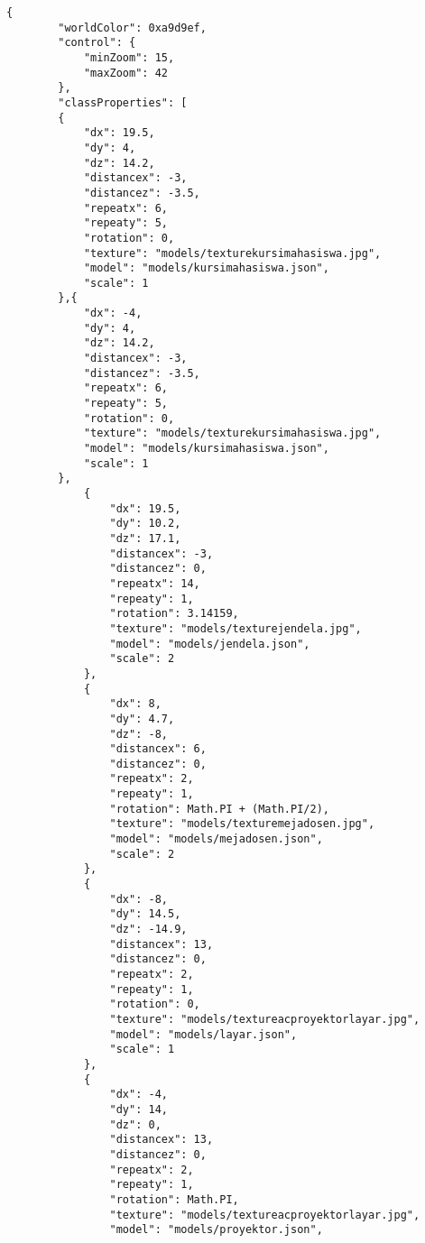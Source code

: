 \begin{lstlisting}[caption={Contoh JSON untuk ruangan kelas pada saat ujian.}, label={lst:json},captionpos=b]
{
        "worldColor": 0xa9d9ef,
        "control": {
            "minZoom": 15,
            "maxZoom": 42
        },
        "classProperties": [
        {
            "dx": 19.5,
            "dy": 4,
            "dz": 14.2,
            "distancex": -3,
            "distancez": -3.5,
            "repeatx": 6,
            "repeaty": 5,
            "rotation": 0,
            "texture": "models/texturekursimahasiswa.jpg",
            "model": "models/kursimahasiswa.json",
            "scale": 1
        },{
            "dx": -4,
            "dy": 4,
            "dz": 14.2,
            "distancex": -3,
            "distancez": -3.5,
            "repeatx": 6,
            "repeaty": 5,
            "rotation": 0,
            "texture": "models/texturekursimahasiswa.jpg",
            "model": "models/kursimahasiswa.json",
            "scale": 1
        },
            {
                "dx": 19.5,
                "dy": 10.2,
                "dz": 17.1,
                "distancex": -3,
                "distancez": 0,
                "repeatx": 14,
                "repeaty": 1,
                "rotation": 3.14159,
                "texture": "models/texturejendela.jpg",
                "model": "models/jendela.json",
                "scale": 2
            },
            {
                "dx": 8,
                "dy": 4.7,
                "dz": -8,
                "distancex": 6,
                "distancez": 0,
                "repeatx": 2,
                "repeaty": 1,
                "rotation": Math.PI + (Math.PI/2),
                "texture": "models/texturemejadosen.jpg",
                "model": "models/mejadosen.json",
                "scale": 2
            },
            {
                "dx": -8,
                "dy": 14.5,
                "dz": -14.9,
                "distancex": 13,
                "distancez": 0,
                "repeatx": 2,
                "repeaty": 1,
                "rotation": 0,
                "texture": "models/textureacproyektorlayar.jpg",
                "model": "models/layar.json",
                "scale": 1
            },
            {
                "dx": -4,
                "dy": 14,
                "dz": 0,
                "distancex": 13,
                "distancez": 0,
                "repeatx": 2,
                "repeaty": 1,
                "rotation": Math.PI,
                "texture": "models/textureacproyektorlayar.jpg",
                "model": "models/proyektor.json",

\end{lstlisting}
